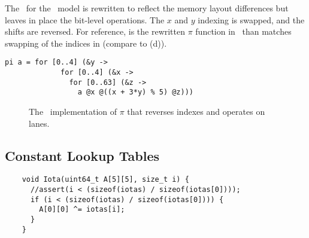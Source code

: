 The \cryptol\ for the \fips\ model is rewritten to reflect the memory layout differences but leaves in place the bit-level operations.
The $x$ and $y$ indexing is swapped, and the shifts are reversed.
For reference,  is the rewritten $\pi$ function in \cryptol\ than matches swapping of the indices in \openssl (compare to (d)).

\newsavebox{\PiOpenSSL}
\begin{lrbox}{\PiOpenSSL}
  \begin{lstlisting}[language=Cryptol]
    pi a = for [0..4] (&y ->
             for [0..4] (&x -> 
               for [0..63] (&z -> 
                 a @x @((x + 3*y) % 5) @z)))  
  \end{lstlisting}
\end{lrbox}

\begin{figure}
  \begin{center}
    \usebox{\PiOpenSSL}
  \end{center}
  \caption{The \openssl\ implementation of $\pi$ that reverses indexes and operates on lanes.}
  \label{fig:piopenssl}
\end{figure}

\subsection{Constant Lookup Tables}

\newsavebox{\ciota}
\begin{lrbox}{\ciota}
  \begin{lstlisting}
    void Iota(uint64_t A[5][5], size_t i) {
      //assert(i < (sizeof(iotas) / sizeof(iotas[0])));
      if (i < (sizeof(iotas) / sizeof(iotas[0]))) {
        A[0][0] ^= iotas[i];
      }
    }
  \end{lstlisting}    
\end{lrbox}


